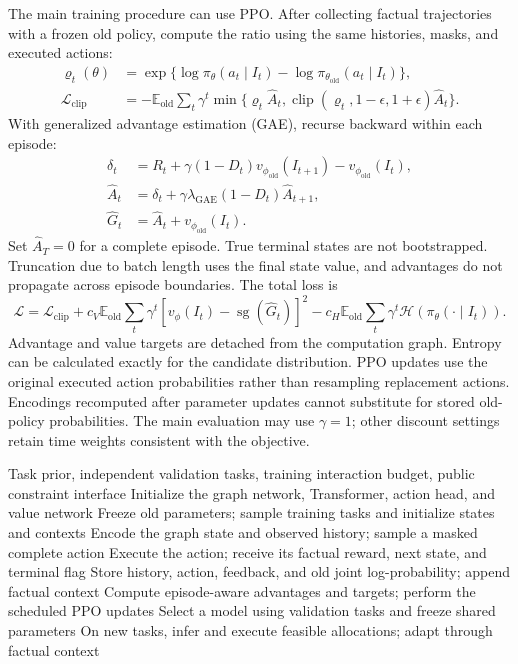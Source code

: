 \documentclass[a4paper,11pt]{article}
\newcommand{\E}{\mathbb E}
\newcommand{\sg}{\operatorname{sg}}
\newcommand{\clip}{\operatorname{clip}}
\numberwithin{equation}{section}
\begin{document}
The main training procedure can use PPO\citep{schulman2017}. After collecting factual trajectories with a frozen old policy, compute the ratio using the same histories, masks, and executed actions:
\begin{align}
\varrho_t(\theta)&=\exp\{\log\pi_\theta(a_t\mid I_t)-\log\pi_{\theta_{\mathrm{old}}}(a_t\mid I_t)\},\\
\mathcal L_{\mathrm{clip}}&=-\E_{\mathrm{old}}\sum_t\gamma^t
\min\{\varrho_t\widehat A_t,
\clip(\varrho_t,1-\epsilon,1+\epsilon)\widehat A_t\}.
\end{align}
With generalized advantage estimation (GAE)\citep{schulman2016}, recurse backward within each episode:
\begin{align}
\delta_t&=R_t+\gamma(1-D_t)v_{\phi_{\mathrm{old}}}(I_{t+1})-v_{\phi_{\mathrm{old}}}(I_t),\\
\widehat A_t&=\delta_t+\gamma\lambda_{\mathrm{GAE}}(1-D_t)\widehat A_{t+1},\\
\widehat G_t&=\widehat A_t+v_{\phi_{\mathrm{old}}}(I_t).
\end{align}
Set $\widehat A_T=0$ for a complete episode. True terminal states are not bootstrapped. Truncation due to batch length uses the final state value, and advantages do not propagate across episode boundaries. The total loss is
\begin{equation}
\mathcal L=\mathcal L_{\mathrm{clip}}
+c_V\E_{\mathrm{old}}\sum_t\gamma^t[v_\phi(I_t)-\sg(\widehat G_t)]^2
-c_H\E_{\mathrm{old}}\sum_t\gamma^t\mathcal H(\pi_\theta(\cdot\mid I_t)).
\end{equation}
Advantage and value targets are detached from the computation graph. Entropy can be calculated exactly for the candidate distribution. PPO updates use the original executed action probabilities rather than resampling replacement actions. Encodings recomputed after parameter updates cannot substitute for stored old-policy probabilities. The main evaluation may use $\gamma=1$; other discount settings retain time weights consistent with the objective.

\begin{algorithm}[htbp]
\caption{Training and deploying an amortized PFN policy from factual interactions}
\label{alg:training}
\begin{algorithmic}[1]
\Require Task prior, independent validation tasks, training interaction budget, public constraint interface
\State Initialize the graph network, Transformer, action head, and value network
  \State Freeze old parameters; sample training tasks and initialize states and contexts
    \State Encode the graph state and observed history; sample a masked complete action
    \State Execute the action; receive its factual reward, next state, and terminal flag
    \State Store history, action, feedback, and old joint log-probability; append factual context
  \EndFor
  \State Compute episode-aware advantages and targets; perform the scheduled PPO updates
\EndFor
\State Select a model using validation tasks and freeze shared parameters
\State On new tasks, infer and execute feasible allocations; adapt through factual context
\end{algorithmic}
\end{algorithm}
\end{document}
